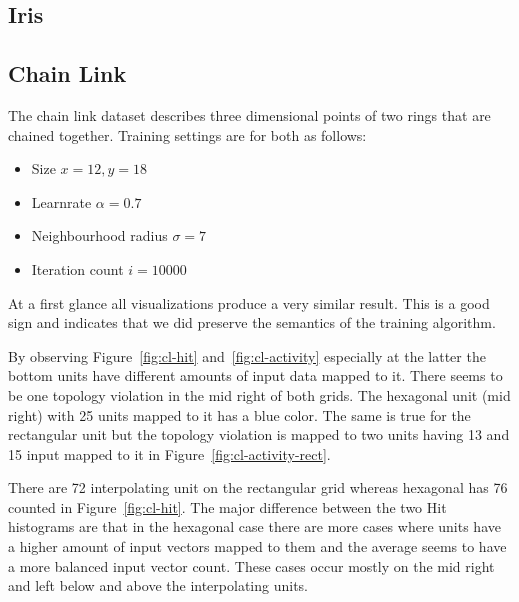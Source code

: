\documentclass{acm_proc_article-sp}
\begin{document}
\subsection{Iris}
\label{sec:iris}

\subsection{Chain Link}
\label{sec:chain-link}

The chain link dataset describes three dimensional points of two rings that are chained together. Training settings are for both as follows:
\begin{itemize}
	\item Size $x = 12, y = 18$
	\item Learnrate $\alpha = 0.7$
	\item Neighbourhood radius $\sigma = 7$
	\item Iteration count $i = 10000$
\end{itemize}

At a first glance all visualizations produce a very similar result. This is a good sign and indicates that we did preserve the semantics of the training algorithm.


By observing Figure~\ref{fig:cl-hit} and~\ref{fig:cl-activity} especially at the latter the
bottom units have different amounts of input data mapped to it. There seems to be one topology
violation in the mid right of both grids. The hexagonal unit (mid right) with 25 units mapped to it has a blue
color. The same is true for the rectangular unit but the topology violation is mapped to two units
having 13 and 15 input mapped to it in Figure~\ref{fig:cl-activity-rect}.

There are 72 interpolating unit on the rectangular grid whereas hexagonal has 76 counted in Figure~\ref{fig:cl-hit}. The major difference between the two Hit histograms are that in the
hexagonal case there are more cases where units have a higher amount of input vectors mapped
to them and the average seems to have a more balanced input vector count. These cases occur mostly
on the mid right and left below and above the interpolating units.

\end{document}
